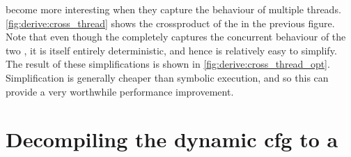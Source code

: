 {\STateMachines} become more interesting when they capture the
behaviour of multiple threads.  \autoref{fig:derive:cross_thread}
shows the \gls{crossproduct} of the {\StateMachines} in the previous
figure.  Note that even though the {\StateMachine} completely captures
the concurrent behaviour of the two {\StateMachines}, it is itself
entirely deterministic, and hence is relatively easy to simplify.  The
result of these simplifications is shown in
\autoref{fig:derive:cross_thread_opt}.  Simplification is generally
cheaper than symbolic execution, and so this can provide a very
worthwhile performance improvement.

\section[Decompiling the dynamic \glsentrytext{cfg} to a \StateMachine]{Decompiling the dynamic \gls{cfg} to a \StateMachine}
\label{sect:derive:compile_cfg}


